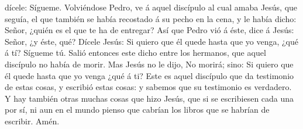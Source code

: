 dícele: Sígueme.  Volviéndose Pedro, ve á aquel discípulo
al cual amaba Jesús, que seguía, el que también se había recostado á su
pecho en la cena, y le había dicho: Señor, ¿quién es el que te ha de
entregar?  Así que Pedro vió á éste, dice á Jesús: Señor,
¿y éste, qué?  Dícele Jesús: Si quiero que él quede hasta
que yo venga, ¿qué á tí? Sígueme tú.  Salió entonces este
dicho entre los hermanos, que aquel discípulo no había de morir. Mas
Jesús no le dijo, No morirá; sino: Si quiero que él quede hasta que yo
venga ¿qué á ti?  Este es aquel discípulo que da testimonio
de estas cosas, y escribió estas cosas: y sabemos que su testimonio es
verdadero.  Y hay también otras muchas cosas que hizo
Jesús, que si se escribiesen cada una por sí, ni aun en el mundo pienso
que cabrían los libros que se habrían de escribir. Amén.
